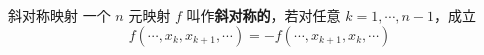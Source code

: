

\begin{definition}{斜对称映射}
一个 $n$ 元映射 $f$ 叫作\textbf{斜对称的}，若对任意 $k=1,\cdots,n-1$，成立
\begin{equation}
f(\cdots,x_k,x_{k+1},\cdots)=-f(\cdots,x_{k+1},x_k,\cdots)
\end{equation}

\end{definition}